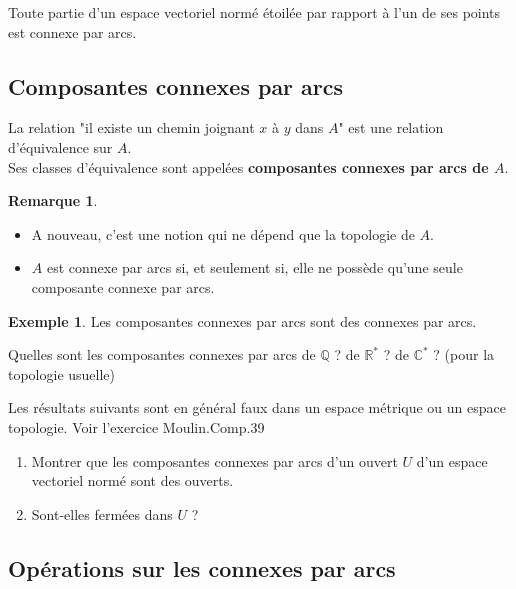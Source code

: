 \documentclass[french]{article}
\newcommand{\Q}{\mathbb{Q}}
\newcommand{\R}{\mathbb{R}}
\newcommand{\C}{\mathbb{C}}
\newcommand{\st}{^*}
\theoremstyle{plain}
\theoremstyle{definition}
\newtheorem*{ex}{Exemple}
\newtheorem*{rmq}{Remarque}
\theoremstyle{remark}
\begin{document}
\begin{prop}%
	Toute partie d'un espace vectoriel normé étoilée par rapport à l'un de ses points est connexe par arcs.
\end{prop}

\subsection{Composantes connexes par arcs}

\begin{prop}%
	La relation "il existe un chemin joignant $x$ à $y$ dans $A$" est une relation d'équivalence sur $A$.\\
	Ses classes d'équivalence sont appelées \textbf{composantes connexes par arcs de $A$}.
\end{prop}

\begin{rmq}
	\begin{itemize}
		\item A nouveau, c'est une notion qui ne dépend que la topologie de $A$.
		\item $A$ est connexe par arcs si, et seulement si, elle ne possède qu'une seule composante connexe par arcs.
	\end{itemize}
\end{rmq}

\begin{ex}
	Les composantes connexes par arcs sont des connexes par arcs.
\end{ex}

\begin{exo}
	Quelles sont les composantes connexes par arcs de $\Q$ ? de $\R\st$ ? de $\C\st$ ? (pour la topologie usuelle)
\end{exo}

\begin{exo}
	Les résultats suivants sont en général faux dans un espace métrique ou un espace topologie. Voir l'exercice Moulin.Comp.39
	\begin{enumerate}
		\item Montrer que les composantes connexes par arcs d'un ouvert $U$ d'un espace vectoriel normé sont des ouverts.
		\item Sont-elles fermées dans $U$ ?
	\end{enumerate}
\end{exo}

\subsection{Opérations sur les connexes par arcs}
\end{document}
